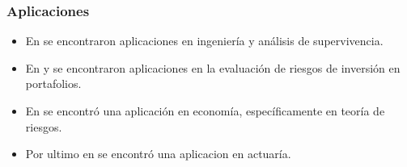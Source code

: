 \begin{frame}
    \frametitle{Aplicaciones}

    \begin{itemize}
        \item En \cite{theory2} se encontraron aplicaciones en ingeniería y análisis
              de supervivencia.
        \item En \cite{application1} y \cite{application2} se encontraron aplicaciones en la evaluación de riesgos de inversión en portafolios.
        \item En \cite{application3} se encontró una aplicación en economía, específicamente en teoría de riesgos.
        \item Por ultimo en \cite{application4} se encontró una aplicacion en actuaría.
    \end{itemize}
\end{frame}

